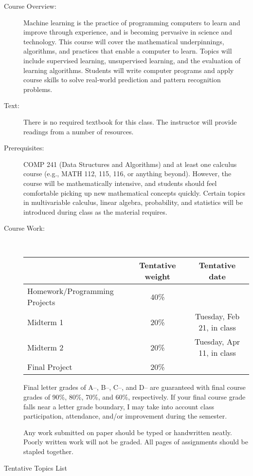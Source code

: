 \documentclass [letterpaper,11pt]{article}
\begin{document}
\begin{description}
\item[Course Overview:] Machine learning is the practice of programming computers to learn and improve through experience, and is becoming pervasive in science and technology. This course will cover the mathematical underpinnings, algorithms, and practices that enable a computer to learn. Topics will include supervised learning, unsupervised learning, and the evaluation of learning algorithms. Students will write computer programs and apply course skills to solve real-world prediction and pattern recognition problems.

\item[Text:] There is no required textbook for this class.  The instructor will provide readings from a number of resources.

\item[Prerequisites:] COMP 241 (Data Structures and Algorithms) and at least one calculus course (e.g., MATH 112, 115, 116, or anything beyond).  However, the course will be mathematically intensive, and students should feel comfortable picking up new mathematical concepts quickly.  Certain topics in multivariable calculus, linear algebra, probability, and statistics will be introduced during class as the material requires.  

\item[Course Work:] \

\begin{tabular}{lcc} 
& Tentative weight & Tentative date \\ \hline
Homework/Programming Projects & 40\% & \\
Midterm 1 & 20\% & Tuesday, Feb 21, in class\\
Midterm 2 & 20\% & Tuesday, Apr 11, in class\\
Final Project & 20\% & \\
\end{tabular}

Final letter grades of A--, B--, C--, and D-- are guaranteed with final course grades of 90\%, 80\%,
70\%, and 60\%, respectively.
If your final course grade falls near a letter grade boundary,
I may take into account class participation, attendance, and/or improvement during the semester.

Any work submitted on paper should be typed or handwritten neatly. Poorly written work will not be graded. All pages of assignments should be stapled together.

\item[Tentative Topics List]\


\end{description}
\end{document}
